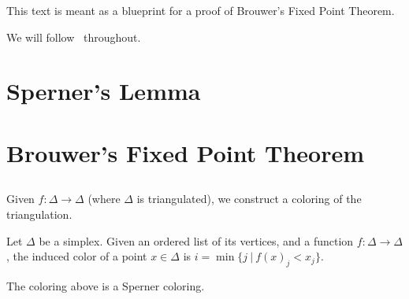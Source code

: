 \maketitle

\begin{remark}
  This text is meant as a blueprint for a proof of Brouwer's Fixed Point Theorem.
\end{remark}

We will follow~\cite{castellana2017} throughout.

\section{Sperner's Lemma}

\begin{definition}
\label{is_sperner_colouring}
\leanok

\end{definition}


\begin{lemma}
  \label{sperner}
  \leanok
\end{lemma}

\section{Brouwer's Fixed Point Theorem}

\subsection{}
Given $f\colon \Delta \to \Delta$ (where $\Delta$ is triangulated), we construct a coloring of the triangulation.

\begin{definition}
\label{def:induced_colouring}
Let $\Delta$ be a simplex. Given an ordered list of its vertices, and a function $f:\Delta \to \Delta$, the induced color of a point $x\in \Delta$ is $i=\min\{j ~|~ f(x)_j < x_j\}$.
\end{definition}

\begin{lemma}
\label{induced_colouring_is_sperner_colouring}
The coloring above is a Sperner coloring.
\end{lemma}

